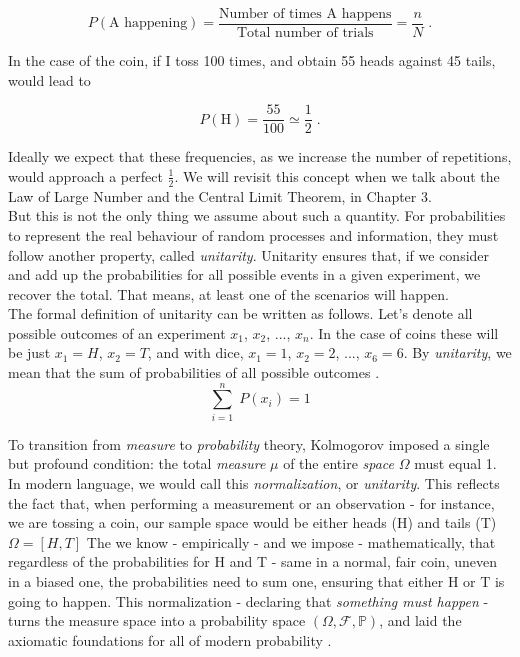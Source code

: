 \documentclass{book}
\begin{document}
\begin{equation}
	P(\text{A happening}) = \frac{\text{Number of times A happens}}{\text{Total number of trials}} = \frac{n}{N} \; . \nonumber
\end{equation}

In the case of the coin, if I toss 100 times, and obtain 55 heads against 45 tails, would lead to 

\begin{equation}
	P(\text{H}) = \frac{55}{100} \simeq \frac{1}{2} \; . \nonumber
\end{equation}

Ideally we expect that these frequencies, as we increase the number of repetitions, would approach a perfect $\frac{1}{2}$. We will revisit this concept when we talk about the Law of Large Number and the Central Limit Theorem, in Chapter 3.\\

But this is not the only thing we assume about such a quantity. For probabilities to represent the real behaviour of random processes and information, they must follow another property, called \textit{unitarity}. Unitarity ensures that, if we consider and add up the probabilities for all possible events in a given experiment, we recover the total. That means, at least one of the scenarios will happen.\\

The formal definition of unitarity can be written as follows. Let's denote all possible outcomes of an experiment $x_{1}$, $x_{2}$, ..., $x_{n}$. In the case of coins these will be just $x_{1} = H$, $x_{2} = T$, and with dice, $x_{1} = 1$, $x_{2} = 2$, ..., $x_{6} = 6$. By \textit{unitarity}, we mean that the sum of probabilities of all possible outcomes . 
\begin{equation}
	\sum_{i = 1}^{n} \; P(x_{i}) = 1
\end{equation}

To transition from \textit{measure} to \textit{probability} theory, Kolmogorov imposed a single but profound condition: the total \textit{measure} $\mu$ of the entire \textit{space} $\Omega$ must equal 1. In modern language, we would call this \textit{normalization}, or \textit{unitarity}. This reflects the fact that, when performing a measurement or an observation - for instance, we are tossing a coin, our sample space would be either heads (H) and tails (T) $\Omega = [H, T]$ The we know - empirically - and we impose - mathematically, that regardless of the probabilities for H and T - same in a normal, fair coin, uneven in a biased one, the probabilities need to sum one, ensuring that either H or T is going to happen. This normalization - declaring that \textit{something must happen} - turns the measure space into a probability space \((\Omega, \mathcal{F}, \mathbb{P})\), and laid the axiomatic foundations for all of modern probability \cite{kolmogorov1933}.
\end{document}
